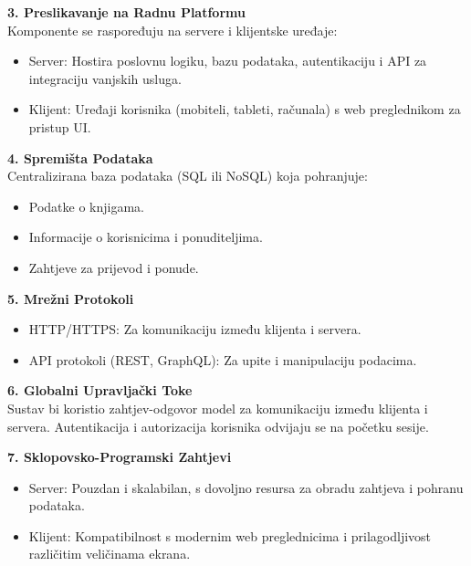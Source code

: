         \textbf{3. Preslikavanje na Radnu Platformu}\\

        Komponente se raspoređuju na servere i klijentske uređaje:
        \begin{itemize}
		  \item {Server: Hostira poslovnu logiku, bazu podataka, autentikaciju i API za integraciju vanjskih usluga.}
		  \item {Klijent: Uređaji korisnika (mobiteli, tableti, računala) s web preglednikom za pristup UI.}
	   \end{itemize}
    
    \textbf{4. Spremišta Podataka}\\

        Centralizirana baza podataka (SQL ili NoSQL) koja pohranjuje:
        \begin{itemize}
		  \item {Podatke o knjigama.}
		  \item {Informacije o korisnicima i ponuditeljima.}
		  \item {Zahtjeve za prijevod i ponude.}				
	   \end{itemize}

    \textbf{5. Mrežni Protokoli}\\
    
    \begin{itemize}
		  \item {HTTP/HTTPS: Za komunikaciju između klijenta i servera.}
		  \item {API protokoli (REST, GraphQL): Za upite i manipulaciju podacima.}
	   \end{itemize}

    \textbf{6. Globalni Upravljački Toke}\\

        Sustav bi koristio zahtjev-odgovor model za komunikaciju između klijenta i servera. Autentikacija i autorizacija korisnika odvijaju se na početku sesije.
    
    \textbf{7. Sklopovsko-Programski Zahtjevi}\\

    \begin{itemize}
		  \item {Server: Pouzdan i skalabilan, s dovoljno resursa za obradu zahtjeva i pohranu podataka.}
		  \item {Klijent: Kompatibilnost s modernim web preglednicima i prilagodljivost različitim veličinama ekrana.}			
	   \end{itemize}

